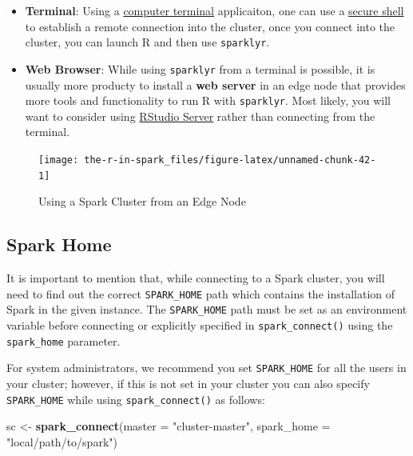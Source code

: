 \documentclass[]{book}
\newenvironment{Shaded}{\begin{snugshade}}{\end{snugshade}}
\newcommand{\DataTypeTok}[1]{\textcolor[rgb]{0.13,0.29,0.53}{#1}}
\newcommand{\KeywordTok}[1]{\textcolor[rgb]{0.13,0.29,0.53}{\textbf{#1}}}
\newcommand{\NormalTok}[1]{#1}
\newcommand{\StringTok}[1]{\textcolor[rgb]{0.31,0.60,0.02}{#1}}
\providecommand{\tightlist}{%
  \setlength{\itemsep}{0pt}\setlength{\parskip}{0pt}}
\theoremstyle{definition}
\theoremstyle{definition}
\theoremstyle{definition}
\theoremstyle{remark}
\begin{document}
\begin{itemize}
\tightlist
\item
  \textbf{Terminal}: Using a
  \href{https://en.wikipedia.org/wiki/Computer_terminal}{computer
  terminal} applicaiton, one can use a
  \href{https://en.wikipedia.org/wiki/Secure_Shell}{secure shell} to
  establish a remote connection into the cluster, once you connect into
  the cluster, you can launch R and then use \texttt{sparklyr}.
\item
  \textbf{Web Browser}: While using \texttt{sparklyr} from a terminal is
  possible, it is usually more producty to install a \textbf{web server}
  in an edge node that provides more tools and functionality to run R
  with \texttt{sparklyr}. Most likely, you will want to consider using
  \href{RStudio\%20Server}{RStudio Server} rather than connecting from
  the terminal.
\end{itemize}

\begin{figure}

{\centering \texttt{[image: the-r-in-spark\_files/figure-latex/unnamed-chunk-42-1]} 

}

\caption{Using a Spark Cluster from an Edge Node}\label{fig:unnamed-chunk-42}
\end{figure}

\hypertarget{spark-home}{%
\subsection{Spark Home}\label{spark-home}}

It is important to mention that, while connecting to a Spark cluster,
you will need to find out the correct \texttt{SPARK\_HOME} path which
contains the installation of Spark in the given instance. The
\texttt{SPARK\_HOME} path must be set as an environment variable before
connecting or explicitly specified in \texttt{spark\_connect()} using
the \texttt{spark\_home} parameter.

For system administrators, we recommend you set \texttt{SPARK\_HOME} for
all the users in your cluster; however, if this is not set in your
cluster you can also specify \texttt{SPARK\_HOME} while using
\texttt{spark\_connect()} as follows:

\begin{Shaded}
\begin{Highlighting}[]
\NormalTok{sc <-}\StringTok{ }\KeywordTok{spark_connect}\NormalTok{(}\DataTypeTok{master =} \StringTok{"cluster-master"}\NormalTok{, }\DataTypeTok{spark_home =} \StringTok{"local/path/to/spark"}\NormalTok{)}
\end{Highlighting}
\end{Shaded}
\end{document}
